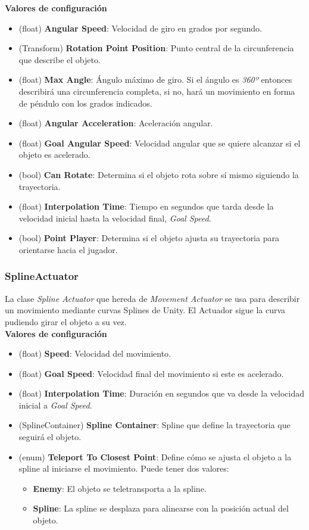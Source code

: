 \textbf{Valores de configuración}
\begin{itemize}
	\item (float) \textbf{Angular Speed}: Velocidad de giro en grados por segundo.
	\item (Transform) \textbf{Rotation Point Position}: Punto central de la circunferencia que describe el objeto.
	\item (float) \textbf{Max Angle}: Ángulo máximo de giro. Si el ángulo es \textit{360º} entonces describirá una circunferencia completa, si no, hará un movimiento en forma de péndulo con los grados indicados.
	\item (float) \textbf{Angular Acceleration}: Aceleración angular.
	\item (float) \textbf{Goal Angular Speed}: Velocidad angular que se quiere alcanzar si el objeto es acelerado.
	\item (bool) \textbf{Can Rotate}: Determina si el objeto rota sobre sí mismo siguiendo la trayectoria.
	\item (float)\textbf{ Interpolation Time}: Tiempo en segundos que tarda desde la velocidad inicial hasta la velocidad final, \textit{Goal Speed}.
	\item (bool) \textbf{Point Player}: Determina si el objeto ajusta su trayectoria para orientarse hacia el jugador.
\end{itemize}

\subsubsection{SplineActuator}
La clase \textit{Spline Actuator} que hereda de \textit{Movement Actuator} se usa para describir un movimiento mediante curvas Splines de Unity. El Actuador sigue la curva pudiendo girar el objeto a su vez.\\

\textbf{Valores de configuración}
\begin{itemize}
	\item (float) \textbf{Speed}: Velocidad del movimiento.
	\item (float) \textbf{Goal Speed}: Velocidad final del movimiento si este es acelerado.
	\item (float) \textbf{Interpolation Time}: Duración en segundos que va desde la velocidad inicial a \textit{Goal Speed}.
	\item (SplineContainer) \textbf{Spline Container}: Spline que define la trayectoria que seguirá el objeto.
	\item (enum) \textbf{Teleport To Closest Point}: Define cómo se ajusta el objeto a la spline al iniciarse el movimiento. Puede tener dos valores:
	\begin{itemize}
		\item \textbf{Enemy}: El objeto se teletransporta a la spline.
		\item \textbf{Spline}: La spline se desplaza para alinearse con la posición actual del objeto.
	\end{itemize}
\end{itemize}

